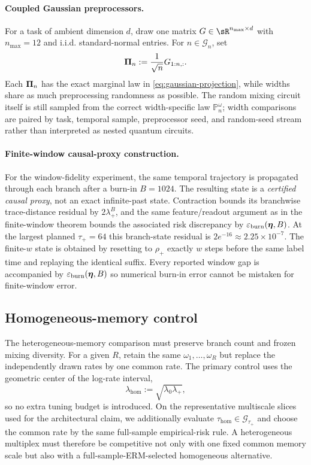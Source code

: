 \paragraph{Coupled Gaussian preprocessors.}
For a task of ambient dimension $d$, draw one matrix
$G\in\sR^{n_{\max}\times d}$ with $n_{\max}=12$ and i.i.d. standard-normal
entries.  For $n\in\mathcal G_n$, set
\begin{equation}
    \bm{\Pi}_n:=\frac1{\sqrt n}G_{1:n,:}.
    \label{eq:coupled-preprocessor}
\end{equation}
Each $\bm{\Pi}_n$ has the exact marginal law in \cref{eq:gaussian-projection},
while widths share as much preprocessing randomness as possible.  The random
mixing circuit itself is still sampled from the correct width-specific law
$\mathbb P_n^\omega$; width comparisons are paired by task, temporal sample,
preprocessor seed, and random-seed stream rather than interpreted as nested
quantum circuits.

\paragraph{Finite-window causal-proxy construction.}
For the window-fidelity experiment, the same temporal trajectory is propagated
through each branch after a burn-in $B=1024$.  The resulting state is a
\emph{certified causal proxy}, not an exact infinite-past state.  Contraction
bounds its branchwise trace-distance residual by $2\lambda_+^B$, and the same
feature/readout argument as in the finite-window theorem bounds the associated
risk discrepancy by $\varepsilon_{\mathrm{burn}}(\bm{\eta},B)$.  At the largest planned
$\tau_+=64$ this branch-state residual is $2e^{-16}\approx2.25\times10^{-7}$.
The finite-$w$ state is obtained by resetting to $\rho_+$ exactly $w$ steps
before the same label time and replaying the identical suffix.  Every reported
window gap is accompanied by $\varepsilon_{\mathrm{burn}}(\bm{\eta},B)$ so numerical burn-in error
cannot be mistaken for finite-window error.

\subsection{Homogeneous-memory control}
\label{app:homogeneous-control}

The heterogeneous-memory comparison must preserve branch count and frozen
mixing diversity.  For a given $R$, retain the same $\omega_1,\ldots,\omega_R$
but replace the independently drawn rates by one common rate.  The primary
control uses the geometric center of the log-rate interval,
\begin{equation}
    \lambda_{\mathrm{hom}}
      :=\sqrt{\lambda_0\lambda_+},
    \label{eq:homogeneous-rate}
\end{equation}
so no extra tuning budget is introduced.  On the representative multiscale
slices used for the architectural claim, we additionally evaluate
$\tau_{\mathrm{hom}}\in\mathcal G_{\tau_+}$ and choose the common rate by the same full-sample empirical-risk rule.  A heterogeneous multiplex must therefore be
competitive not only with one fixed common memory scale but also with a
full-sample-ERM-selected homogeneous alternative.

